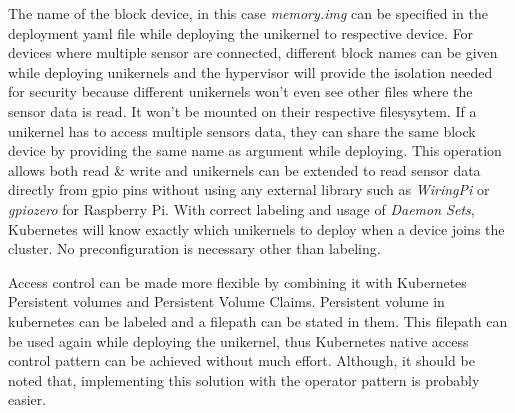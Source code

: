 The name of the block device, in this case \textit{memory.img} can be specified in the deployment yaml file while deploying the unikernel to respective device. For devices where multiple sensor are connected, different block names can be given while deploying unikernels and the hypervisor will provide the isolation needed for security because different unikernels won't even see other files where the sensor data is read. It won't be mounted on their respective filesysytem. If a unikernel has to access multiple sensors data, they can share the same block device by providing the same name as argument while deploying. This operation allows both read \& write and unikernels can be extended to read sensor data directly from gpio pins without using any external library such as \textit{WiringPi} or \textit{gpiozero} for Raspberry Pi. With correct labeling and usage of \textit{Daemon Sets}, Kubernetes will know exactly which unikernels to deploy when a device joins the cluster. No preconfiguration is necessary other than labeling.

Access control can be made more flexible by combining it with Kubernetes Persistent volumes and Persistent Volume Claims. Persistent volume in kubernetes can be labeled and a filepath can be stated in them. This filepath can be used again while deploying the unikernel, thus Kubernetes native access control pattern can be achieved without much effort. Although, it should be noted that, implementing this solution with the operator pattern is probably easier.